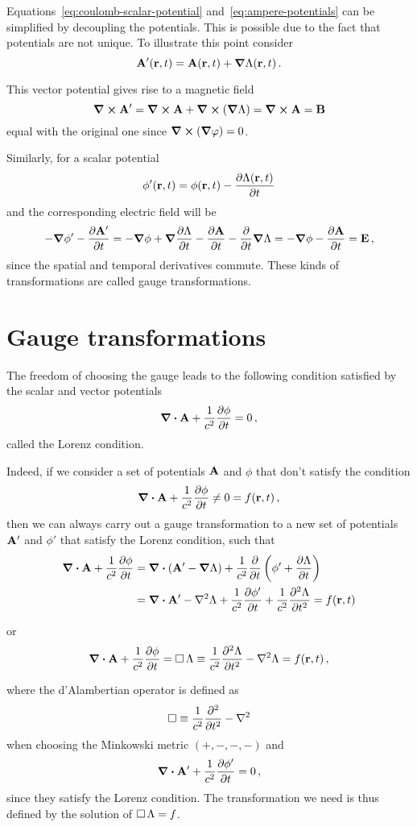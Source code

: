 \documentclass[12pt, class=report, crop=false]{standalone}
\begin{document}
Equations~\eqref{eq:coulomb-scalar-potential} and~\eqref{eq:ampere-potentials}
can be simplified by decoupling the potentials. This is possible due to the fact
that potentials are not unique. To illustrate this point consider
\[
  \vb{A}'(\vb{r},t) = \vb{A}(\vb{r},t) + \grad{\Lambda}(\vb{r},t)\,.
\]

This vector potential gives rise to a magnetic field
\[
  \curl{\vb{A}'} = \curl{\vb{A}} + \curl(\grad{\Lambda}) = \curl{\vb{A}} = \vb{B}
\]
equal with the original one since \( \curl(\grad{\varphi}) = 0 \).

Similarly, for a scalar potential
\[
  \phi'(\vb{r},t) = \phi(\vb{r},t) - \pdv{\Lambda(\vb{r},t)}{t}
\]
and the corresponding electric field will be
\[
  - \grad{\phi'} - \pdv{\vb{A'}}{t} =
  - \grad{\phi} + \grad{\pdv{\Lambda}{t}} - \pdv{\vb{A}}{t} - \pdv{t} \grad{\Lambda}
  = - \grad{\phi} - \pdv{\vb{A}}{t}
  = \vb{E}\,,
\]
since the spatial and temporal derivatives commute. These kinds of transformations
are called gauge transformations.

\section{Gauge transformations}

The freedom of choosing the gauge leads to the following condition satisfied by
the scalar and vector potentials
\[
  \div{\vb{A}} + \frac{1}{c^2}\pdv{\phi}{t} = 0\,,
\]
called the Lorenz condition.

Indeed, if we consider a set of potentials \(\vb{A}\) and \(\phi\) that
don't satisfy the condition
\[
  \div{\vb{A}} + \frac{1}{c^2}\pdv{\phi}{t} \ne 0 = f(\vb{r},t)\,,
\]
then we can always carry out a gauge transformation to a new set of potentials
\(\vb{A}'\) and \(\phi'\) that satisfy the Lorenz condition, such that
\begin{align*}
  \div{\vb{A}} + \frac{1}{c^2}\pdv{\phi}{t} &= \div(\vb{A}' - \grad{\Lambda})
    + \frac{1}{c^2}\pdv{t} \left( \phi' + \pdv{\Lambda}{t} \right) \\
    &= \div{\vb{A}'} - \laplacian{\Lambda} + \frac{1}{c^2}\pdv{\phi'}{t}
    + \frac{1}{c^2}\pdv[2]{\Lambda}{t}
    = f(\vb{r},t)
\end{align*}

or
\[
  \div{\vb{A}} + \frac{1}{c^2}\pdv{\phi}{t} =
  \dalambert \Lambda \equiv \frac{1}{c^2}\pdv[2]{\Lambda}{t} - \laplacian{\Lambda} = f(\vb{r},t)\,,
\]

where the d'Alambertian operator is defined as
\[
  \dalambert \equiv \frac{1}{c^2}\pdv[2]{t} - \laplacian
\]
when choosing the Minkowski metric \( (+,-,-,-) \) and
\[
  \div{\vb{A'}} + \frac{1}{c^2}\pdv{\phi'}{t} = 0\,,
\]
since they satisfy the Lorenz condition.
The transformation we need is thus defined by the solution of \(\operatorname{\Box} \Lambda = f\).
\end{document}
